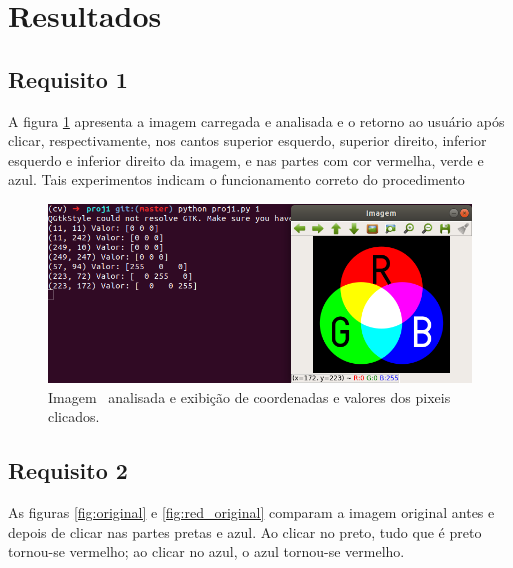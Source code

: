 \documentclass{bmvc2k}
\begin{document}
\section{Resultados}
\label{sec:res}
\subsection{Requisito 1}
A figura \ref{fig:requisto 1} apresenta a imagem carregada e analisada e o retorno ao usuário após clicar, respectivamente, nos cantos superior esquerdo, superior direito, inferior esquerdo e inferior direito da imagem, e nas partes com cor vermelha, verde e azul. Tais experimentos indicam o funcionamento correto do procedimento

\begin{figure}[htb]
  \centering
  \includegraphics[width=0.9\linewidth]{Figs/requisito1.png}
  \caption{Imagem~\cite{wiki:requisito1} analisada e exibição de coordenadas e valores dos pixeis clicados.}
  \label{fig:requisto 1}
\end{figure}

\subsection{Requisito 2}
As figuras \ref{fig:original} e \ref{fig:red_original} comparam a imagem original antes e depois de clicar nas partes pretas e azul. Ao clicar no preto, tudo que é preto tornou-se vermelho; ao clicar no azul, o azul tornou-se vermelho.
\end{document}

